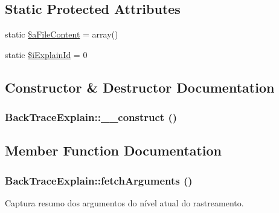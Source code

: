 \subsection*{Static Protected Attributes}
\begin{CompactItemize}
\item 
static \hyperlink{class_back_trace_explain_bc66a959dd0c9dd7fa44b770beeccfbc}{\$aFileContent} = array()
\item 
static \hyperlink{class_back_trace_explain_a232cb65ebfb6fc0202bf16cf93e04c0}{\$iExplainId} = 0
\end{CompactItemize}


\subsection{Constructor \& Destructor Documentation}
\hypertarget{class_back_trace_explain_bff895e7ada850dfc6a085768d3eaf7c}{
\subsubsection[{\_\-\_\-construct}]{\setlength{\rightskip}{0pt plus 5cm}BackTraceExplain::\_\-\_\-construct ()}}
\label{class_back_trace_explain_bff895e7ada850dfc6a085768d3eaf7c}




\subsection{Member Function Documentation}
\hypertarget{class_back_trace_explain_de9dbd3de5542aebcbf59e965d963b8a}{
\subsubsection[{fetchArguments}]{\setlength{\rightskip}{0pt plus 5cm}BackTraceExplain::fetchArguments ()}}
\label{class_back_trace_explain_de9dbd3de5542aebcbf59e965d963b8a}


Captura resumo dos argumentos do nível atual do rastreamento.

